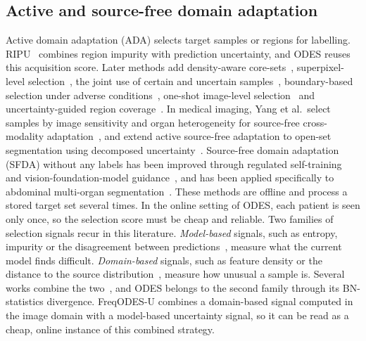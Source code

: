 \documentclass[a4paper,fleqn]{cas-dc}
\begin{document}
\subsection{Active and source-free domain adaptation}
Active domain adaptation (ADA) selects target samples or regions for labelling. RIPU~\cite{xie2022ripu} combines region impurity with prediction uncertainty, and ODES reuses this acquisition score. Later methods add density-aware core-sets~\cite{liu2024density}, superpixel-level selection~\cite{gao2024superpixel}, the joint use of certain and uncertain samples~\cite{safaei2025certainty}, boundary-based selection under adverse conditions~\cite{xu2025boundaryada}, one-shot image-level selection~\cite{yan2026tcada} and uncertainty-guided region coverage~\cite{huynh2026category}. In medical imaging, Yang et al.\ select samples by image sensitivity and organ heterogeneity for source-free cross-modality adaptation~\cite{yang2025asfda}, and extend active source-free adaptation to open-set segmentation using decomposed uncertainty~\cite{yang2026openset}. Source-free domain adaptation (SFDA) without any labels has been improved through regulated self-training~\cite{zhang2025regulated} and vision-foundation-model guidance~\cite{shi2026tell2adapt}, and has been applied specifically to abdominal multi-organ segmentation~\cite{elsayed2025abdominal,elsayed2026zerolead}. These methods are offline and process a stored target set several times. In the online setting of ODES, each patient is seen only once, so the selection score must be cheap and reliable. Two families of selection signals recur in this literature. \emph{Model-based} signals, such as entropy, impurity or the disagreement between predictions~\cite{xie2022ripu,safaei2025certainty,xu2025boundaryada}, measure what the current model finds difficult. \emph{Domain-based} signals, such as feature density or the distance to the source distribution~\cite{liu2024density,yang2025asfda}, measure how unusual a sample is. Several works combine the two~\cite{huynh2026category,yang2026openset}, and ODES belongs to the second family through its BN-statistics divergence. FreqODES-U combines a domain-based signal computed in the image domain with a model-based uncertainty signal, so it can be read as a cheap, online instance of this combined strategy.
\end{document}
